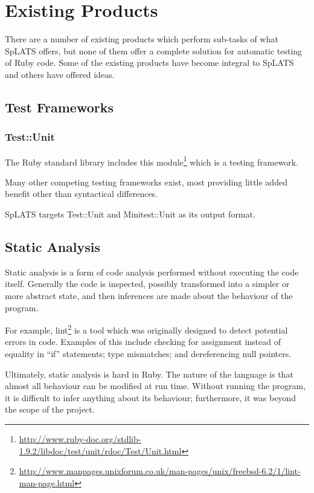 \chapter{Existing Products}

There are a number of existing products which perform sub-tasks of what SpLATS offers, but none of them offer a complete solution for automatic testing of Ruby code. Some of the existing products have become integral to SpLATS and others have offered ideas.

\section{Test Frameworks}

  \subsection{Test::Unit}
    The Ruby standard library includes this
module\footnote{\url{http://www.ruby-doc.org/stdlib-1.9.2/libdoc/test/unit/rdoc/Test/Unit.html}}
which is a testing framework.

Many other competing testing frameworks exist, most providing little added
benefit other than syntactical differences.

SpLATS targets Test::Unit and Minitest::Unit as its output format.

\section{Static Analysis}

  Static analysis is a form of code analysis performed without executing the code itself. Generally the code is inspected, possibly
  transformed into a simpler or more abstract state, and then inferences are made about the behaviour of the program.

  For example, lint\footnote{\url{http://www.manpages.unixforum.co.uk/man-pages/unix/freebsd-6.2/1/lint-man-page.html}}
  is a tool which was originally designed to detect potential errors in
  code. Examples of this include checking for assignment instead of equality in ``if'' statements; type mismatches; and dereferencing null pointers.

  Ultimately, static analysis is hard in Ruby. The nature of the language is that
  almost all behaviour can be modified at run time. Without running the program,
  it is difficult to infer anything about its behaviour; furthermore, it was beyond
  the scope of the project.
  
